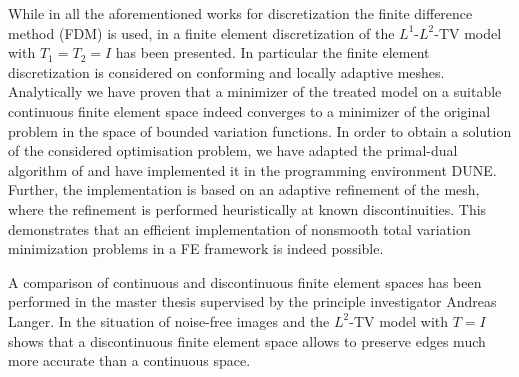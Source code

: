\documentclass[enabledeprecatedfontcommands,cleardoublepage=empty,headsepline,twoside,11pt,DIV=15,BCOR=12mm,final]{scrartcl}
\newcommand{\dune}{\textsf{DUNE}\xspace}
\begin{document}
While in all the aforementioned works for discretization the finite difference method (FDM) is used, in  a finite element discretization of the $L^1$-$L^2$-TV model with $T_1=T_2=I$ has been presented. In particular the finite element discretization is considered on conforming and locally adaptive meshes. Analytically we have proven that a minimizer of the treated model on a suitable continuous finite element space indeed converges to a minimizer of the original problem in the space of bounded variation functions. In order to obtain a solution of the considered optimisation problem, we have adapted the primal-dual algorithm of \cite{ChambollePock:11}  and have implemented it in the programming environment \dune \cite{BaBlDeEnKlKuOhSa:06}. Further, the implementation is based on an adaptive refinement of the mesh, where the refinement is performed heuristically at known discontinuities. This demonstrates that an efficient implementation of nonsmooth total variation minimization problems in a FE framework is indeed possible. 

A comparison of continuous and discontinuous finite element spaces has been performed in the master thesis  supervised by the principle investigator Andreas Langer. In the situation of noise-free images and the $L^2$-TV model with $T=I$ shows that a discontinuous finite element space allows to preserve edges much more accurate than a continuous space.

\end{document}
